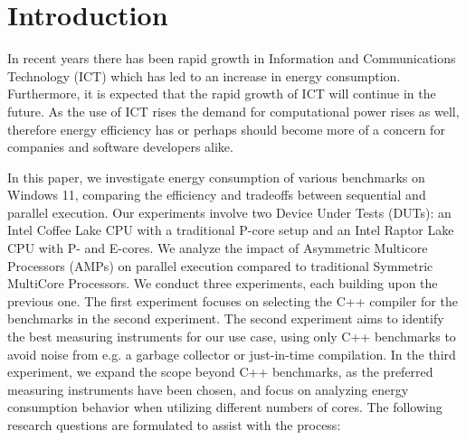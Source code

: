 \section{Introduction}

In recent years there has been rapid growth in Information and Communications Technology (ICT) which has led to an increase in energy consumption. Furthermore, it is expected that the rapid growth of ICT will continue in the future. \cite{jones2018stop,andrae2015global} As the use of ICT rises the demand for computational power rises as well, therefore energy efficiency has or perhaps should become more of a concern for companies and software developers alike.

In this paper, we investigate energy consumption of various benchmarks on Windows 11, comparing the efficiency and tradeoffs between sequential and parallel execution. Our experiments involve two Device Under Tests (DUTs): an Intel Coffee Lake CPU with a traditional P-core setup and an Intel Raptor Lake CPU with P- and E-cores. We analyze the impact of Asymmetric Multicore Processors (AMPs) on parallel execution compared to traditional Symmetric MultiCore Processors. We conduct three experiments, each building upon the previous one. The first experiment focuses on selecting the C++ compiler for the benchmarks in the second experiment. The second experiment aims to identify the best measuring instruments for our use case, using only C++ benchmarks to avoid noise from e.g. a garbage collector or just-in-time compilation. In the third experiment, we expand the scope beyond C++ benchmarks, as the preferred measuring instruments have been chosen, and focus on analyzing energy consumption behavior when utilizing different numbers of cores. The following research questions are formulated to assist with the process:

